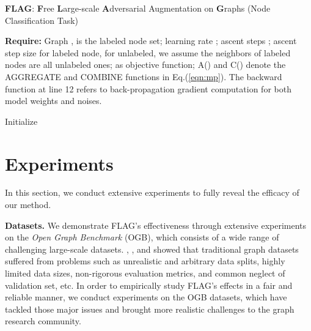 \documentclass[11pt]{article}
\begin{document}
\begin{algorithm}[tb] 
  \caption{\textbf{FLAG}: \textbf{F}ree \textbf{L}arge-scale \textbf{A}dversarial Augmentation on \textbf{G}raphs (Node Classification Task)}
  \label{alg:node}
  \textbf{Require:} Graph ,  is the labeled node set; learning rate ; ascent steps ; ascent step size  for labeled node,  for unlabeled, we assume the neighbors of labeled nodes are all unlabeled ones;  as objective function; A() and C() denote the AGGREGATE and COMBINE functions in Eq.(\ref{eqn:mp}). The backward function at line 12 refers to back-propagation gradient computation for both model weights and noises.
  \begin{algorithmic}[1] 
    \State Initialize 


        \For{}

            \State  
            \State  
\For{}
                \State 
                \State 
                \For{}
                    \State 
                    \State 
                \EndFor 
                
                \State 
                \State 




                \State 
                
                \State 
                
\EndFor
            \State 
            
\EndFor


  \end{algorithmic}
\end{algorithm}


%
  \section{Experiments}
\label{exp}

In this section, we conduct extensive experiments to fully reveal the efficacy of our method.





{\bf Datasets.} We demonstrate FLAG's effectiveness through extensive experiments on the \textit{Open Graph Benchmark} (OGB), which consists of a wide range of challenging large-scale datasets. \citet{shchur2018pitfalls}, \citet{errica2019fair}, and \citet{dwivedi2020benchmarking} showed that traditional graph datasets suffered from problems such as unrealistic and arbitrary data splits, highly limited data sizes, non-rigorous evaluation metrics, and common neglect of validation set, etc. In order to empirically study FLAG's effects in a fair and reliable manner, we conduct experiments on the OGB \citep{hu2020open} datasets, which have tackled those major issues and brought more realistic challenges to the graph research community. 
\end{document}
